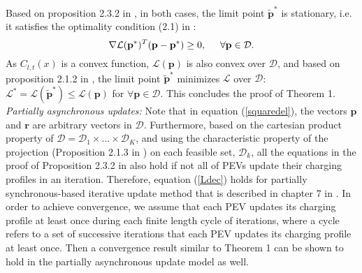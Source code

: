 \documentclass[12pt,draftcls,onecolumn]{IEEEtran}
\begin{document}
 \indent Based on proposition 2.3.2 in \cite{B99}, in both cases, the limit point $\mathbf{\tilde{p}}^{*}$ is stationary, i.e. it satisfies the optimality condition (2.1) in \cite{B99}:\\
\begin{equation}
\nabla \mathcal{L}(\mathbf{p}^*)^{T}(\mathbf{p}-\mathbf{p}^*) \geq 0, \hspace{5mm} \forall \mathbf{p}\in \mathcal{D}.
\label{stationary}
\end{equation}
\indent As $C_{l,t}(x)$ is a convex function, $\mathcal{L}(\mathbf{p})$ is also convex over $\mathcal{D}$, and based on proposition 2.1.2 in \cite{B99}, the limit point $\mathbf{\tilde{p}}^{*}$ minimizes $\mathcal{L}$ over $\mathcal{D}$: $\mathcal{L}^*=\mathcal{L}(\mathbf{\tilde{p}^*}) \leq \mathcal{L}(\mathbf{p})$ for $\forall \mathbf{p} \in \mathcal{D}$. This concludes the proof of Theorem 1.\\
\indent \emph{Partially asynchronous updates:} Note that in equation (\ref{squaredel}), the vectors $\mathbf{p}$ and $\mathbf{r}$ are arbitrary vectors in $\mathcal{D}$. Furthermore, based on the cartesian product property of $\mathcal{D}=\mathcal{D}_1\times ...\times \mathcal{D}_{K}$, and using the characteristic property of the projection (Proposition 2.1.3 in \cite{B99}) on each feasible set, $\mathcal{D}_k$, all the equations in the proof of Proposition 2.3.2 in \cite{B99} also hold if not all of PEVs update their charging profiles in an iteration. Therefore, equation (\ref{Ldec}) holds for partially synchronous-based iterative update method that is described in chapter 7 in \cite{BT89}. In order to achieve convergence, we assume that each PEV updates its charging profile at least once during each finite length cycle of iterations, where a cycle refers to a set of successive iterations that each PEV updates its charging profile at least once. Then a convergence result similar to Theorem 1 can be shown to hold in the partially asynchronous update model as well. \\
\end{document}
